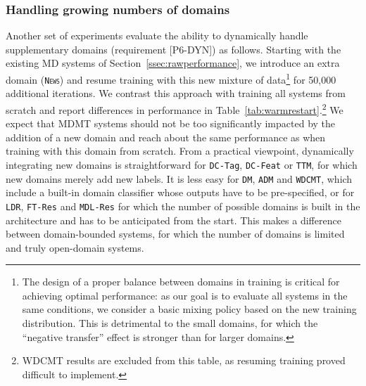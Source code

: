 \documentclass[11pt,a4paper]{article}
\newcommand{\fyDone}[1]{\done[FY]\Todo[FY:]{\textcolor{orange}{#1}}}
\newcommand{\domain}[1]{\texttt{\textsc{#1}}}
\newcommand{\system}[1]{\texttt{{#1}}}
\begin{document}
\subsubsection{Handling growing numbers of domains}
Another set of experiments evaluate the ability to dynamically handle supplementary domains (requirement [P6-DYN]) as follows. Starting with the existing MD systems of Section~\ref{ssec:rawperformance}, we introduce an extra domain (\domain{News}) and resume training with this new mixture of data\footnote{The design of a proper balance between domains in training is critical for achieving optimal performance: as our goal is to evaluate all systems in the same conditions, we consider a basic mixing policy based on the new training distribution. This is detrimental to the small domains, for which the ``negative transfer'' effect is stronger than for larger domains.} for 50,000 additional iterations.\fyDone{Training regime of continuation} We contrast this approach with training all systems from scratch and report differences in performance in Table~\ref{tab:warmrestart}.\footnote{WDCMT results are excluded from this table, as resuming training proved difficult to implement.}\fyDone{Ecrire un commentaire} 
We expect that MDMT systems should not be too significantly impacted by the addition of a new domain and reach about the same performance as when training with this domain from scratch. From a practical viewpoint, dynamically integrating new domains is straightforward for \system{DC-Tag}, \system{DC-Feat} or \system{TTM}, for which new domains merely add new labels. It is less easy for \system{DM}, \system{ADM} and \system{WDCMT}, which include a built-in domain classifier whose outputs have to be pre-specified, or for \system{LDR}, \system{FT-Res} and \system{MDL-Res} for which the number of possible domains is built in the architecture and has to be anticipated from the start. This makes a difference between domain-bounded systems, for which the number of domains is limited and truly open-domain systems.%
\end{document}
